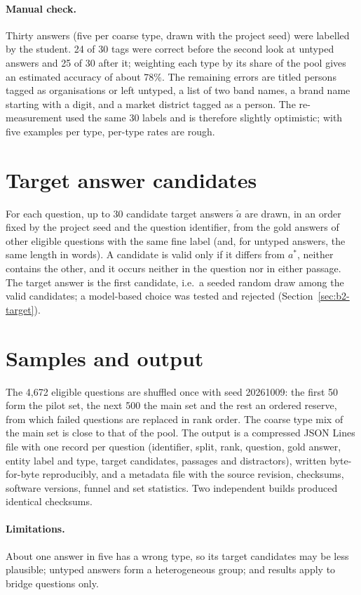 \documentclass[11pt,a4paper]{report}
\begin{document}
\paragraph{Manual check.}
Thirty answers (five per coarse type, drawn with the project seed) were labelled
by the student. 24 of 30 tags were correct before the second look at untyped
answers and 25 of 30 after it; weighting each type by its share of the pool
gives an estimated accuracy of about 78\%. The remaining errors are titled
persons tagged as organisations or left untyped, a list of two band names, a
brand name starting with a digit, and a market district tagged as a person.
The re-measurement used the same 30 labels and is therefore slightly
optimistic; with five examples per type, per-type rates are rough.

\section{Target answer candidates}\label{sec:b1-targets}
For each question, up to 30 candidate target answers $\tilde{a}$ are drawn, in
an order fixed by the project seed and the question identifier, from the gold
answers of other eligible questions with the same fine label (and, for untyped
answers, the same length in words). A candidate is valid only if it differs
from $a^{*}$, neither contains the other, and it occurs neither in the
question nor in either passage. The target answer is the first candidate, i.e.\ a seeded random draw among the valid candidates; a model-based choice was tested and rejected (Section~\ref{sec:b2-target}).

\section{Samples and output}\label{sec:b1-output}
The 4{,}672 eligible questions are shuffled once with seed 20261009: the first
50 form the pilot set, the next 500 the main set and the rest an ordered
reserve, from which failed questions are replaced in rank order. The coarse
type mix of the main set is close to that of the pool. The output is a
compressed JSON Lines file with one record per question (identifier, split,
rank, question, gold answer, entity label and type, target candidates,
passages and distractors), written byte-for-byte reproducibly, and a metadata
file with the source revision, checksums, software versions, funnel and set
statistics. Two independent builds produced identical checksums.

\paragraph{Limitations.}
About one answer in five has a wrong type, so its target candidates may be
less plausible; untyped answers form a heterogeneous group; and results apply
to bridge questions only.
\end{document}
